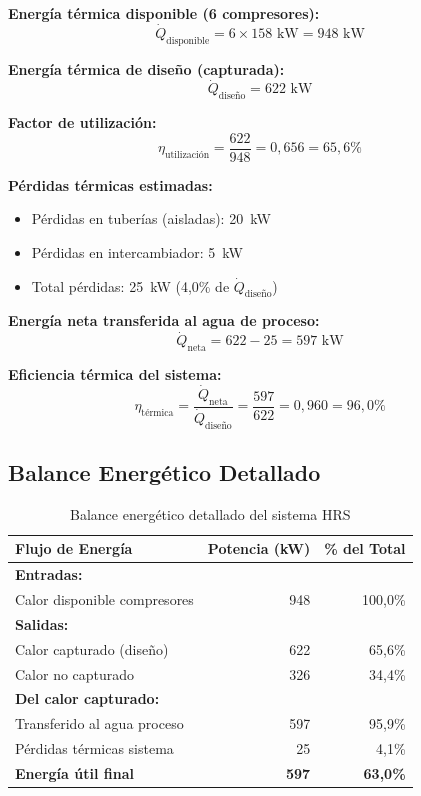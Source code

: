\documentclass[12pt,a4paper]{article}
\begin{document}
\textbf{Energía térmica disponible (6 compresores):}
\begin{equation}
\dot{Q}_{\text{disponible}} = 6 \times 158 \text{ kW} = 948 \text{ kW}
\end{equation}

\textbf{Energía térmica de diseño (capturada):}
\begin{equation}
\dot{Q}_{\text{diseño}} = 622 \text{ kW}
\end{equation}

\textbf{Factor de utilización:}
\begin{equation}
\eta_{\text{utilización}} = \frac{622}{948} = 0{,}656 = 65{,}6\%
\end{equation}

\textbf{Pérdidas térmicas estimadas:}
\begin{itemize}
    \item Pérdidas en tuberías (aisladas): 20~kW
    \item Pérdidas en intercambiador: 5~kW
    \item Total pérdidas: 25~kW (4,0\% de $\dot{Q}_{\text{diseño}}$)
\end{itemize}

\textbf{Energía neta transferida al agua de proceso:}
\begin{equation}
\dot{Q}_{\text{neta}} = 622 - 25 = 597 \text{ kW}
\end{equation}

\textbf{Eficiencia térmica del sistema:}
\begin{equation}
\eta_{\text{térmica}} = \frac{\dot{Q}_{\text{neta}}}{\dot{Q}_{\text{diseño}}} = \frac{597}{622} = 0{,}960 = 96{,}0\%
\end{equation}

\subsection{Balance Energético Detallado}

\begin{table}[h]
\centering
\caption{Balance energético detallado del sistema HRS}
\begin{tabular}{lrr}
\toprule
\textbf{Flujo de Energía} & \textbf{Potencia (kW)} & \textbf{\% del Total} \\
\midrule
\textbf{Entradas:} & & \\
Calor disponible compresores & 948 & 100,0\% \\
\textbf{Salidas:} & & \\
Calor capturado (diseño) & 622 & 65,6\% \\
Calor no capturado & 326 & 34,4\% \\
\textbf{Del calor capturado:} & & \\
Transferido al agua proceso & 597 & 95,9\% \\
Pérdidas térmicas sistema & 25 & 4,1\% \\
\midrule
\textbf{Energía útil final} & \textbf{597} & \textbf{63,0\%} \\
\bottomrule
\end{tabular}
\end{table}
\end{document}
